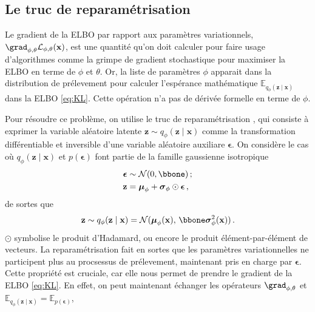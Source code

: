 \subsection{Le truc de reparamétrisation}
Le gradient de la ELBO par rapport aux paramètres variationnels, $\grad_{\phi,\theta}\mathcal{L}_{\phi,\theta}(\mathbf{x})$, 
est une quantité qu'on doit calculer pour faire usage d'algorithmes comme la grimpe de gradient stochastique 
pour maximiser la ELBO en terme de $\phi$ et $\theta$. 
Or, la liste de paramètres $\phi$ apparait dans la distribution de prélevement pour calculer 
l'espérance mathématique $\mathbb{E}_{q_\phi(\mathbf{z} \mid \mathbf{x})}$ dans la ELBO \eqref{eq:KL}.
Cette opération n'a pas de dérivée formelle en terme de $\phi$. 

Pour résoudre ce problème, on utilise le truc de reparamétrisation \citep{Kingma2013}, 
qui consiste à exprimer la variable aléatoire latente $\mathbf{z} \sim q_\phi (\mathbf{z} \mid \mathbf{x})$ 
comme la transformation différentiable et inversible d'une variable aléatoire auxiliare $\boldsymbol{\epsilon}$.
On considère le cas où $q_\phi(\mathbf{z} \mid \mathbf{x})$ et $p(\boldsymbol{ \epsilon})$ 
font partie de la famille gaussienne isotropique
\begin{align}
        \label{eq:p epsilon}
        \boldsymbol{\epsilon} &\sim \mathcal{N}(0, \bbone)\, ;\\
        \label{eq:reparametrisation}
        \mathbf{z} &= \boldsymbol{\mu}_\phi + \boldsymbol{ \sigma}_\phi \odot \boldsymbol{ \epsilon}\, , 
\end{align} 
de sortes que 
\begin{equation}\label{eq:q phi}
        \mathbf{z} \sim q_\phi(\mathbf{z} \mid \mathbf{x}) = \mathcal{N}(\boldsymbol{ \mu}_\phi (\mathbf{x}),\, \bbone \boldsymbol{\sigma}_\phi^{2}(\mathbf{x}))\, .
\end{equation} 
$\odot$ symbolise le produit d'Hadamard, ou encore le produit élément-par-élément de vecteurs.
La reparamétrisation fait en sortes que les paramètres variationnelles ne participent plus au procsessus de prélevement, 
maintenant pris en charge par $\boldsymbol{ \epsilon} $.
Cette propriété est cruciale, car elle nous permet de prendre le gradient de la ELBO \eqref{eq:KL}. 
En effet, on peut maintenant échanger les opérateurs $\grad_{\phi,\theta}$ et ${\mathbb{E}_{q_\phi(\mathbf{z} \mid \mathbf{x})} = \mathbb{E}_{p(\boldsymbol{ \epsilon})}}$,
